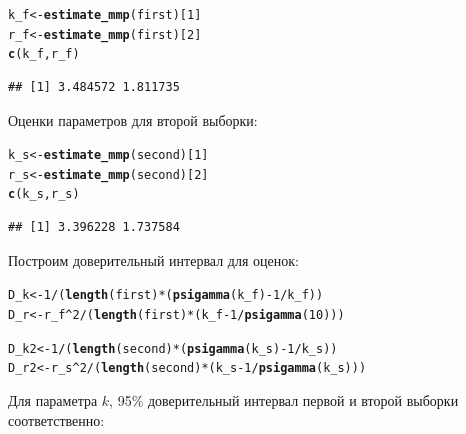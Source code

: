 \documentclass{article}\usepackage[]{graphicx}\usepackage[]{color}
\makeatletter
\newcommand{\hlnum}[1]{\textcolor[rgb]{0.686,0.059,0.569}{#1}}%
\newcommand{\hlopt}[1]{\textcolor[rgb]{0,0,0}{#1}}%
\newcommand{\hlstd}[1]{\textcolor[rgb]{0.345,0.345,0.345}{#1}}%
\newcommand{\hlkwb}[1]{\textcolor[rgb]{0.69,0.353,0.396}{#1}}%
\newcommand{\hlkwd}[1]{\textcolor[rgb]{0.737,0.353,0.396}{\textbf{#1}}}%
\newenvironment{kframe}{%
 \def\at@end@of@kframe{}%
 \ifinner\ifhmode%
  \def\at@end@of@kframe{\end{minipage}}%
  \begin{minipage}{\columnwidth}%
 \fi\fi%
 \def\FrameCommand##1{\hskip\@totalleftmargin \hskip-\fboxsep
 \colorbox{shadecolor}{##1}\hskip-\fboxsep
     \hskip-\linewidth \hskip-\@totalleftmargin \hskip\columnwidth}%
 \MakeFramed {\advance\hsize-\width
   \@totalleftmargin\z@ \linewidth\hsize
   \@setminipage}}%
 {\par\unskip\endMakeFramed%
 \at@end@of@kframe}
\newenvironment{knitrout}{}{} %
\makeatother
\begin{document}
\begin{knitrout}
\color{fgcolor}\begin{kframe}
\begin{alltt}
\hlstd{k_f} \hlkwb{<-} \hlkwd{estimate_mmp}\hlstd{(first)[}\hlnum{1}\hlstd{]}
\hlstd{r_f} \hlkwb{<-} \hlkwd{estimate_mmp}\hlstd{(first)[}\hlnum{2}\hlstd{]}
\hlkwd{c}\hlstd{(k_f, r_f)}
\end{alltt}
\begin{verbatim}
## [1] 3.484572 1.811735
\end{verbatim}
\end{kframe}
\end{knitrout}
Оценки параметров для второй выборки:

\begin{knitrout}
\color{fgcolor}\begin{kframe}
\begin{alltt}
\hlstd{k_s} \hlkwb{<-} \hlkwd{estimate_mmp}\hlstd{(second)[}\hlnum{1}\hlstd{]}
\hlstd{r_s} \hlkwb{<-} \hlkwd{estimate_mmp}\hlstd{(second)[}\hlnum{2}\hlstd{]}
\hlkwd{c}\hlstd{(k_s, r_s)}
\end{alltt}
\begin{verbatim}
## [1] 3.396228 1.737584
\end{verbatim}
\end{kframe}
\end{knitrout}
Построим доверительный интервал для оценок:

\begin{knitrout}
\color{fgcolor}\begin{kframe}
\begin{alltt}
\hlstd{D_k} \hlkwb{<-} \hlnum{1} \hlopt{/} \hlstd{(}\hlkwd{length}\hlstd{(first)} \hlopt{*} \hlstd{(}\hlkwd{psigamma}\hlstd{(k_f)} \hlopt{-} \hlnum{1} \hlopt{/} \hlstd{k_f))}
\hlstd{D_r} \hlkwb{<-} \hlstd{r_f}\hlopt{^}\hlnum{2} \hlopt{/} \hlstd{(}\hlkwd{length}\hlstd{(first)} \hlopt{*} \hlstd{(k_f} \hlopt{-} \hlnum{1} \hlopt{/} \hlkwd{psigamma}\hlstd{(}\hlnum{10}\hlstd{)))}

\hlstd{D_k2} \hlkwb{<-} \hlnum{1} \hlopt{/} \hlstd{(}\hlkwd{length}\hlstd{(second)} \hlopt{*} \hlstd{(}\hlkwd{psigamma}\hlstd{(k_s)} \hlopt{-} \hlnum{1} \hlopt{/} \hlstd{k_s))}
\hlstd{D_r2} \hlkwb{<-} \hlstd{r_s}\hlopt{^}\hlnum{2} \hlopt{/} \hlstd{(}\hlkwd{length}\hlstd{(second)} \hlopt{*} \hlstd{(k_s} \hlopt{-} \hlnum{1} \hlopt{/} \hlkwd{psigamma}\hlstd{(k_s)))}
\end{alltt}
\end{kframe}
\end{knitrout}
Для параметра $k$, 95\% доверительный интервал первой и второй выборки соответственно:
\end{document}
